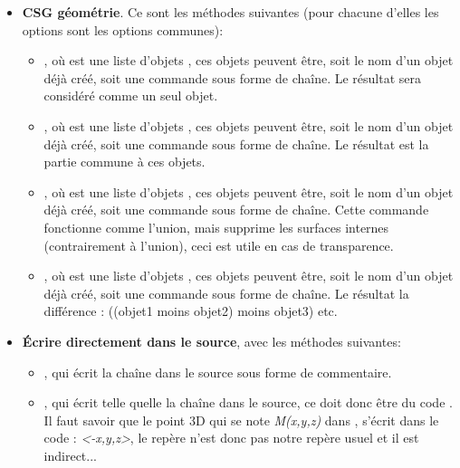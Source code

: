 \begin{itemize}
\begin{itemize}
            \item {}, qui dessine une boîte dont les faces sont parallèles à celles de la fenêtre 3D du graphique, les points 3D  et  représente une diagonale de cette boîte, plus précisément $=$M(xinf, yinf, zinf) et $=$M(xsup, ysup, zsup). Ce sont les options communes.
        \end{itemize}

    \item \textbf{CSG géométrie}. Ce sont les méthodes suivantes (pour chacune d'elles les options sont les options communes):
        \begin{itemize}
            \item {}, où  est une liste d'objets \povray, ces objets peuvent être, soit le nom d'un objet déjà créé, soit une commande \povray sous forme de chaîne. Le résultat sera considéré comme un seul objet.
            
            \item {}, où  est une liste d'objets \povray, ces objets peuvent être, soit le nom d'un objet déjà créé, soit une commande \povray sous forme de chaîne. Le résultat est la partie commune à ces objets.
            
            \item {}, où  est une liste d'objets \povray, ces objets peuvent être, soit le nom d'un objet déjà créé, soit une commande \povray sous forme de chaîne. Cette commande fonctionne comme l'union, mais supprime les surfaces internes (contrairement à l'union), ceci est utile en cas de transparence.
            
            \item {}, où  est une liste d'objets \povray, ces objets peuvent être, soit le nom d'un objet déjà créé, soit une commande \povray sous forme de chaîne. Le résultat la différence : ((objet1 moins objet2) moins objet3) etc.
        \end{itemize}
        
    \item \textbf{Écrire directement dans le source}, avec les méthodes suivantes:
        \begin{itemize}
            \item {}, qui écrit la chaîne  dans le source sous forme de commentaire.
            \item {}, qui écrit telle quelle la chaîne  dans le source, ce doit donc être du code \povray. Il faut savoir que le point 3D qui se note \emph{M(x,y,z)} dans \luadrawenv, s'écrit dans le code \povray: \emph{<-x,y,z>}, le repère \povray n'est donc pas notre repère usuel et il est indirect...
        \end{itemize}
\end{itemize}

